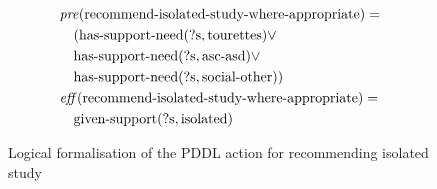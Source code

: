 \begin{figure}[t]
  \small  %
  \begin{align*}
  &\mathit{pre}(\text{recommend-isolated-study-where-appropriate}) = \\
  &\quad (\text{has-support-need}(\text{?s}, \text{tourettes}) \lor \\
  &\quad \text{has-support-need}(\text{?s}, \text{asc-asd}) \lor \\
  &\quad \text{has-support-need}(\text{?s}, \text{social-other})) \\
  &\mathit{eff}(\text{recommend-isolated-study-where-appropriate}) = \\
  &\quad \text{given-support}(\text{?s}, \text{isolated})
  \end{align*}
  \caption{Logical formalisation of the PDDL action for recommending isolated study}\label{fig:isolated-study}
\end{figure}